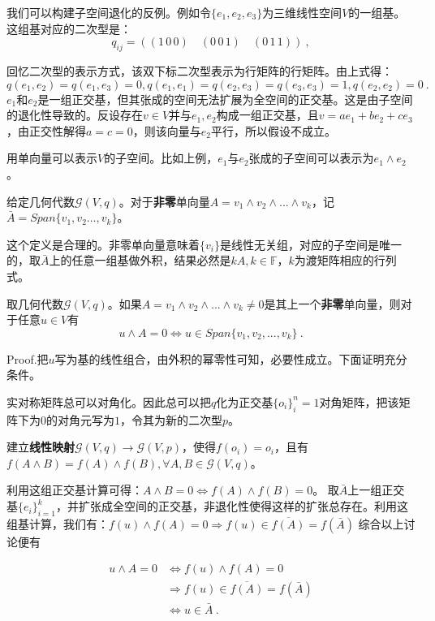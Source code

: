 我们可以构建子空间退化的反例。例如令$\{e_1,e_2,e_3\}$为三维线性空间$V$的一组基。这组基对应的二次型是：
\begin{equation}
q_{ij}=((1\,0\,0)\quad (0\,0\,1)\quad(0\,1\,1))~,
\end{equation}

回忆二次型的表示方式，该双下标二次型表示为行矩阵的行矩阵。由上式得：$$q(e_1,e_2)=q(e_1,e_3)=0,q(e_1,e_1)=q(e_2,e_3)=q(e_3,e_3)=1,q(e_2,e_2)=0~.$$
$e_1$和$e_2$是一组正交基，但其张成的空间无法扩展为全空间的正交基。这是由子空间的退化性导致的。反设存在$v\in V$并与$e_1,e_2$构成一组正交基，且$v=ae_1+be_2+ce_3$，由正交性解得$a=c=0$，则该向量与$e_2$平行，所以假设不成立。

用单向量可以表示$V$的子空间。比如上例，$e_1$与$e_2$张成的子空间可以表示为$e_1\wedge e_2$。
\begin{definition}{}
给定几何代数$\mathcal G(V,q)$。对于\textbf{非零}单向量$A=v_1\wedge v_2\wedge ...\wedge  v_k$，记$\bar{A}=Span\{v_1,v_2\dots,v_k\}$。
\end{definition}
这个定义是合理的。非零单向量意味着$\{v_i\}$是线性无关组，对应的子空间是唯一的，取$\bar A$上的任意一组基做外积，结果必然是$kA,k\in\mathbb F$，$k$为渡矩阵相应的行列式。
\begin{theorem}{}
取几何代数$\mathcal G(V,q)$。如果$A=v_1\wedge v_2\wedge...\wedge v_k \neq 0 $是其上一个\textbf{非零}单向量，则对于任意$u\in V$有
\begin{equation}
u\wedge A=0\Longleftrightarrow  u\in Span\{v_1,v_2,...,v_k\}~.
\end{equation}
\end{theorem}
Proof.把$u$写为基的线性组合，由外积的幂零性可知，必要性成立。下面证明充分条件。

实对称矩阵总可以对角化。因此总可以把$q$化为正交基$\{o_i\}^n_i=1$对角矩阵，把该矩阵下为0的对角元写为$1$，令其为新的二次型$p$。

建立\textbf{线性映射}$\mathcal G(V,q)\rightarrow \mathcal G(V,p)$，使得$f(o_i)=o_i$，且有$f(A\wedge B)=f(A)\wedge f(B),\forall A,B\in\mathcal G(V,q)$。

利用这组正交基计算可得：$A\wedge B=0\Longleftrightarrow f(A)\wedge f(B)=0$。
取$\bar A$上一组正交基$\{e_i\}^k_{i=1}$，并扩张成全空间的正交基，非退化性使得这样的扩张总存在。利用这组基计算，我们有：$f(u)\wedge f(A)=0\Rightarrow f(u)\in\overline{f(A)}=f(\bar{A})$
综合以上讨论便有

\begin{equation}
\begin{aligned}
u\wedge A=0 &\Longleftrightarrow f(u)\wedge f(A)=0\\
&\Longrightarrow f(u)\in\overline{f(A)}=f(\bar{A})\\
&\Longleftrightarrow u\in\bar{A}~.
\end{aligned}
\end{equation}

